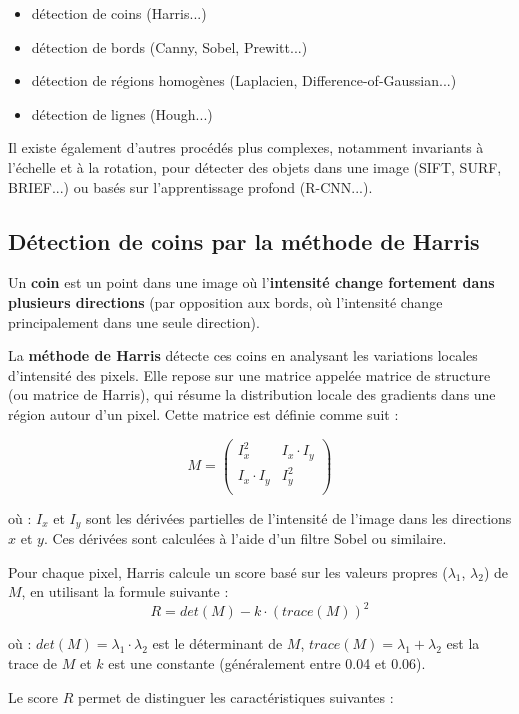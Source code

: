 \documentclass[a4paper,11pt,titlepage]{article} %
\begin{document}
\begin{itemize}
	\item détection de coins (Harris...)
	\item détection de bords (Canny, Sobel, Prewitt...)
	\item détection de régions homogènes (Laplacien, Difference-of-Gaussian...)
	\item détection de lignes (Hough...)
\end{itemize}

Il existe également d'autres procédés plus complexes, notamment invariants à l'échelle et à la rotation, pour détecter des objets dans une image (SIFT, SURF, BRIEF...) ou basés sur l'apprentissage profond (R-CNN...).


\subsection{Détection de coins par la méthode de Harris}

Un \textbf{coin} est un point dans une image où l'\textbf{intensité change fortement dans plusieurs directions} (par opposition aux bords, où l'intensité change principalement dans une seule direction).

La \textbf{méthode de Harris} détecte ces coins en analysant les variations locales d'intensité des pixels. Elle repose sur une matrice appelée matrice de structure (ou matrice de Harris), qui résume la distribution locale des gradients dans une région autour d'un pixel. Cette matrice est définie comme suit :

$$M = \begin{pmatrix}
I_x^2 & I_x \cdot I_y \\
I_x \cdot I_y & I_y^2\\
\end{pmatrix}$$


où : $I_x$ et $I_y$ sont les dérivées partielles de l'intensité de l'image dans les directions $x$ et $y$. Ces dérivées sont calculées à l'aide d'un filtre Sobel ou similaire.


Pour chaque pixel, Harris calcule un score basé sur les valeurs propres ($\lambda_1$, $\lambda_2$) de $M$, en utilisant la formule suivante : 
$$R = det(M) - k \cdot (trace(M))^2$$
 
où : $det(M) = \lambda_1 \cdot \lambda_2$ est le déterminant de $M$, $trace(M) = \lambda_1 + \lambda_2$ est la trace de $M$ et $k$ est une constante (généralement entre 0.04 et 0.06).

Le score $R$ permet de distinguer les caractéristiques suivantes :
\end{document}
